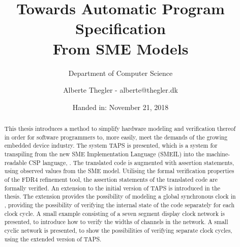 \documentclass[a4paper]{report}
\author{Alberte Thegler - alberte@thegler.dk}
\title{Towards Automatic Program Specification \\ From SME Models}
\subtitle{Department of Computer Science}
\date{Handed in: November 21, 2018}
\begin{document}
\maketitle



\begin{abstract}
\begin{doublespace}
This thesis introduces a method to simplify hardware modeling and verification
thereof in order for software programmers to, more easily, meet the demands of
the growing embedded device industry. The system TAPS is presented, which is a
system for transpiling from the new SME Implementation Language (SMEIL) into the
machine-readable CSP language, \cspm{}.
The translated \cspm{} code is augmented with assertion statements, using
observed values from the SME model. Utilising the formal verification
properties of the FDR4 refinement tool, the assertion statements of the
translated \cspm{} code are formally verified.
An extension to the initial version of TAPS is introduced in the thesis. The extension provides the possibility of modeling a global synchronous clock in
\cspm{}, providing the possibility of verifying the internal state of the
\cspm{} code separately for each clock cycle.
A small example consisting of a
seven segment display clock network is presented, to introduce how to verify the
widths of channels in the network. A small cyclic network is presented, to
show the possibilities of verifying separate clock cycles, using the extended
version of TAPS.
\end{doublespace}
\end{abstract}


\newpage
\tableofcontents

\newpage
{}


%
\end{document}
